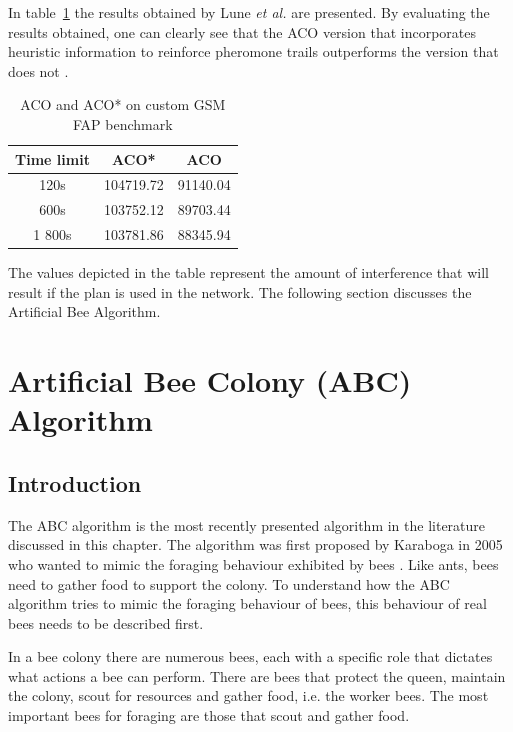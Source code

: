In table~\ref{tab:ACO} the results obtained by Lune \emph{et al.}\cite{ACOvsEA} are presented. By evaluating the results obtained, one can clearly see that the \gls{ACO} version that incorporates heuristic information to reinforce pheromone trails outperforms the version that does not \cite{ACOvsEA}. 
\begin{table}[H]
\centering
	\begin{tabular}{| c | c | c |}
	\hline
	Time limit & \gls{ACO}* & \gls{ACO} \\ \hline
	120s & 104719.72 & 91140.04 \\ \hline
	600s & 103752.12 & 89703.44 \\ \hline
	1 800s & 103781.86 & 88345.94 \\ \hline
	\end{tabular}
\caption{ACO and \gls{ACO}* on custom GSM \gls{FAP} benchmark\cite{ACOvsEA}}
\label{tab:ACO}
\end{table}
The values depicted in the table represent the amount of interference that will result if the plan is used in the network\cite{ACOvsEA}. The following section discusses the Artificial Bee Algorithm.
\section{Artificial Bee Colony (ABC) Algorithm}
\label{sec:BEE}

\subsection{Introduction}
The \gls{ABC} algorithm is the most recently presented algorithm in the literature discussed in this chapter\cite{ABCCompareStudy,ABCLeafConstrained,ABCNumericalOptimization}. The algorithm was first proposed by Karaboga in 2005 who wanted to mimic the foraging behaviour exhibited by bees \cite{ABCCompareStudy,ABCLeafConstrained,ABCNumericalOptimization}. Like ants, bees need to gather food to support the colony. To understand how the \gls{ABC} algorithm tries to mimic the foraging behaviour of bees, this behaviour of real bees needs to be described first\cite{ABCCompareStudy}. 

In a bee colony there are numerous bees, each with a specific role that dictates what actions a bee can perform. There are bees that protect the queen, maintain the colony, scout for resources and gather food, i.e. the worker bees. The most important bees for foraging are those that scout and gather food\cite{ABCCompareStudy}. 

